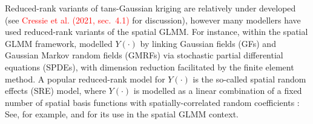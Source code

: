 \documentclass[nojss]{jss}
\newcommand{\red}[1]{\textcolor{red}{#1}}
\begin{document}
 Reduced-rank variants of tans-Gaussian kriging are relatively under developed (see \red{Cressie et al. (2021, sec.~4.1)} for discussion), however many modellers have used reduced-rank variants of the spatial GLMM. 
 For instance, within the spatial GLMM framework, \cite{Lindgren_Rue_2011_GF_GMRF_SPDE} modelled $Y(\cdot)$ by linking Gaussian fields (GFs) and Gaussian Markov random fields (GMRFs) via stochastic partial differential equations (SPDEs), 
 with dimension reduction facilitated by the finite element method. %
  A popular reduced-rank model for $Y(\cdot)$ is the so-called spatial random effects (SRE) model, where $Y(\cdot)$ is modelled as a linear combination of a fixed number of spatial basis functions with spatially-correlated random coefficients \citep{Cressie_Johannesson_2008_FRK}: See, for example,  \cite{Sengupta_Cressie_2013_spatial_GLMM_FRK} and \citet{Bradley_2016_Bayesian_spatial_COS_lattice_data} for its use in the spatial GLMM context. 
\end{document}
